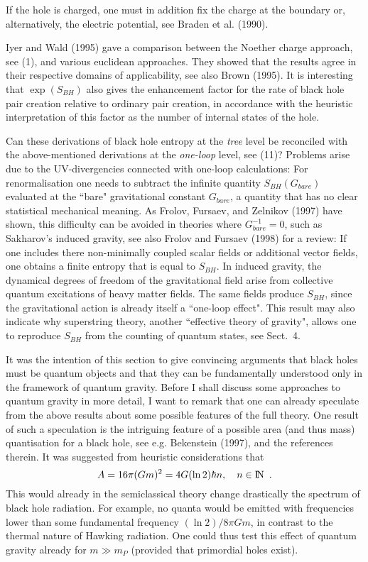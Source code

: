 \documentclass[12pt]{article}
\def\bbbn{{\rm I\!N}} %
\newcommand{\be}{\begin{equation}}
\newcommand{\ee}{\end{equation}}
\begin{document}
If the hole is charged, one must in addition fix the charge at the
boundary or, alternatively, the electric potential, see
Braden et al. (1990).

\vskip 2mm
\small

Iyer and Wald (1995) gave a comparison between
the Noether charge approach, see (1), and various euclidean
approaches. They showed that the results agree in their respective
domains of applicability, see also Brown (1995).
It is interesting that $\exp(S_{BH})$ also gives the
enhancement factor for the rate of black hole pair creation
relative to ordinary pair creation, in accordance with
the heuristic interpretation of this factor as the number of internal
states of the hole.

\vskip 2mm
\normalsize
Can these derivations of black hole entropy at the {\em tree} level
be reconciled with the above-mentioned derivations at the
{\em one-loop} level, see (11)? Problems arise due to the 
UV-divergencies connected with one-loop calculations:
For renormalisation one needs to subtract the infinite quantity
$S_{BH}(G_{bare})$ evaluated at the ``bare" gravitational constant
$G_{bare}$, a quantity that has no clear statistical mechanical meaning.
As Frolov, Fursaev, and Zelnikov (1997) have shown, this difficulty
can be avoided in theories where $G_{bare}^{-1}=0$, such as
Sakharov's induced gravity, see also Frolov and Fursaev (1998)
for a review: If one includes there non-minimally coupled scalar fields
or additional vector fields, one obtains a finite entropy
that is equal to $S_{BH}$. In induced gravity, the dynamical degrees
of freedom of the gravitational field arise from collective
quantum excitations of heavy matter fields. The same fields
produce $S_{BH}$, since the gravitational action is already itself
a ``one-loop effect". This result may also indicate why
superstring theory, another ``effective theory of gravity",
allows one to reproduce $S_{BH}$ from the counting of
quantum states, see Sect.~4.

It was the intention of this section to give convincing arguments
that black holes must be quantum objects and that they can be
fundamentally understood only in the framework of quantum gravity.
Before I shall discuss some approaches to quantum gravity
in more detail, I want to remark that one can already speculate
from the above results about some possible features of the
full theory. One result of such a speculation is the intriguing
feature of a possible area (and thus mass) quantisation for
a black hole, see e.g. Bekenstein (1997), and the references 
therein. It was suggested from heuristic considerations that
\be A=16\pi(Gm)^2=4G(\ln 2)\hbar n, \quad n\in\bbbn \enspace .\ee
This would already in the semiclassical theory change drastically
the spectrum of black hole radiation. For example, no quanta
would be emitted with frequencies lower than some fundamental
frequency $(\ln 2)/8\pi Gm$, in contrast to the thermal nature
of Hawking radiation. One could thus test this effect of quantum gravity
already for $m\gg m_P$ (provided that primordial holes exist).
\end{document}
